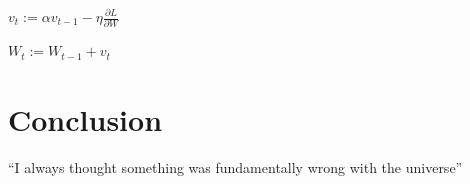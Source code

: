 \documentclass{article}
\begin{document}
\begin{center}
\begin{math}
v_t := \alpha v_{t-1} - \eta  \frac{\partial L}{\partial W}
\end{math}
\end{center}

\begin{center}
\begin{math}
W_t := W_{t-1} + v_t
\end{math}
\end{center}


\section{Conclusion}
``I always thought something was fundamentally wrong with the universe'' \citep{adams1995hitchhiker}



\end{document}
